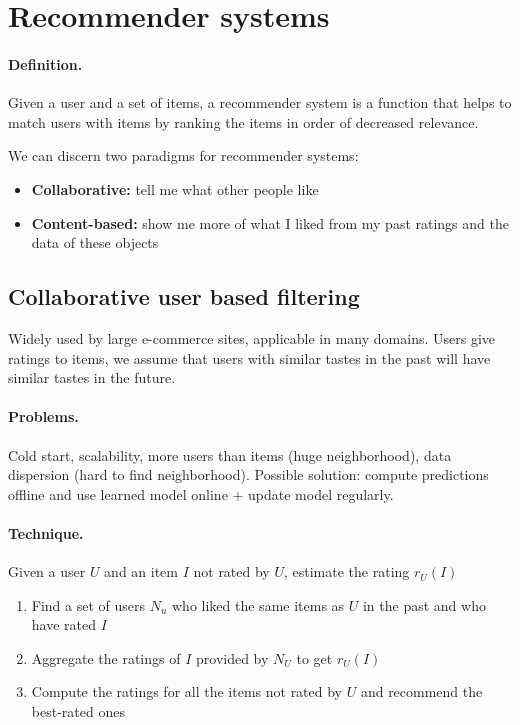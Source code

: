 
\section{Recommender systems}

\paragraph{Definition.} Given a user and a set of items, a recommender system is a function that helps to match users with items by ranking the items in order of decreased relevance.

We can discern two paradigms for recommender systems: 
\begin{itemize}
  \item \textbf{Collaborative:} tell me what other people like
  \item \textbf{Content-based:} show me more of what I liked from my past ratings and the data of these objects
\end{itemize}

\subsection{Collaborative user based filtering}

Widely used by large e-commerce sites, applicable in many domains. Users give ratings to items, we assume that users with similar tastes in the past will have similar tastes in the future.

\paragraph{Problems.} Cold start, scalability, more users than items (huge neighborhood), data dispersion (hard to find neighborhood). Possible solution: compute predictions offline and use learned model online + update model regularly.

\paragraph{Technique.} Given a user $U$ and an item $I$ not rated by $U$, estimate the rating $r_U(I)$

\begin{enumerate}
  \item Find a set of users $N_u$ who liked the same items as $U$ in the past and who have rated $I$
  \item Aggregate the ratings of $I$ provided by $N_U$ to get $r_U(I)$
  \item Compute the ratings for all the items not rated by $U$ and recommend the best-rated ones 
\end{enumerate}

